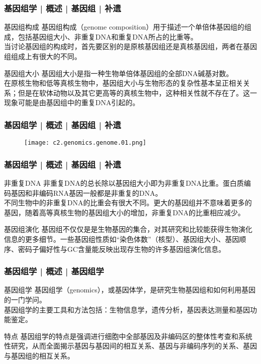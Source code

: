 \begin{frame}
  \frametitle{基因组学 | 概述 | 基因组 | 补遗}
  \begin{block}{基因组构成}
基因组构成（genome composition）用于描述一个单倍体基因组的组成，包括基因组大小、非重复DNA和重复DNA所占的比重等。\\
\vspace{1em}
当讨论基因组的构成时，首先要区别的是原核基因组还是真核基因组，两者在基因组组成上有很大的不同。
  \end{block}
  \pause
  \begin{block}{基因组大小}
基因组大小是指一种生物单倍体基因组的全部DNA碱基对数。\\
\vspace{1em}
在原核生物和低等真核生物中，基因组大小与生物形态的复杂性基本呈正相关关系；但是在软体动物以及其它更高等的真核生物中，这种相关性就不存在了。这一现象可能是由基因组中的重复DNA引起的。 
  \end{block}
\end{frame}

\begin{frame}
  \frametitle{基因组学 | 概述 | 基因组 | 补遗}
  \begin{figure}
    \centering
    \texttt{[image: c2.genomics.genome.01.png]}
  \end{figure}
\end{frame}

\begin{frame}
  \frametitle{基因组学 | 概述 | 基因组 | 补遗}
  \begin{block}{非重复DNA}
非重复DNA的总长除以基因组大小即为非重复DNA比重。蛋白质编码基因和非编码RNA基因一般都是非重复的DNA。\\
\vspace{1em}
不同生物中的非重复DNA的比重会有很大不同。更大的基因组并不意味着更多的基因，随着高等真核生物的基因组大小的增加，非重复DNA的比重相应减少。
  \end{block}
  \pause
  \begin{block}{基因组演化}
基因组不仅仅是是生物基因的集合，对其研究和比较能获得生物演化信息的更多细节。一些基因组性质如“染色体数”（核型）、基因组大小、基因顺序、密码子偏好性与GC含量能反映出现存生物的许多基因组演化信息。
  \end{block}
\end{frame}

\begin{frame}
  \frametitle{基因组学 | 概述 | 基因组学}
  \begin{block}{基因组学}
基因组学（genomics），或基因体学，是研究生物基因组和如何利用基因的一门学问。\\
\vspace{0.5em}
基因组学的主要工具和方法包括：生物信息学，遗传分析，基因表达测量和基因功能鉴定。
  \end{block}
  \pause
  \begin{block}{特点}
基因组学的特点是强调进行细胞中全部基因及非编码区的整体性考查和系统性研究，从而全面揭示基因与基因间的相互关系、基因与非编码序列的关系、基因与基因组的相互关系。
  \end{block}
\end{frame}

